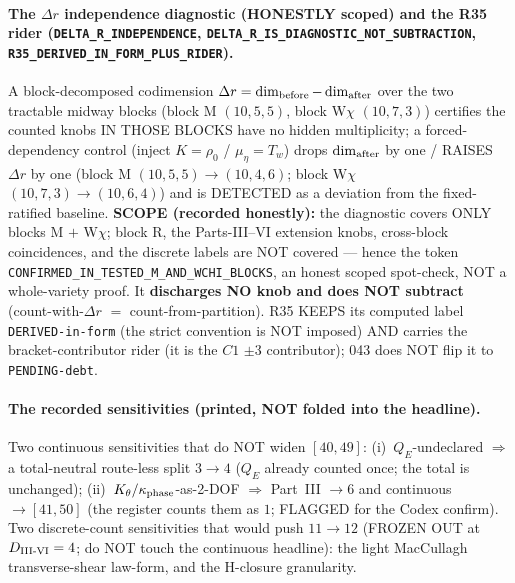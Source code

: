 \paragraph{The \(\Delta r\) independence diagnostic (HONESTLY scoped) and the R35 rider (\texttt{DELTA\_R\_INDEPENDENCE}, \texttt{DELTA\_R\_IS\_DIAGNOSTIC\_NOT\_SUBTRACTION}, \texttt{R35\_DERIVED\_IN\_FORM\_PLUS\_RIDER}).}
A block-decomposed codimension \(\Delta r=\dim_{\rm before}-\dim_{\rm after}\) over
the two tractable midway blocks (block M \((10,5,5)\), block W\(\chi\) \((10,7,3)\))
certifies the counted knobs IN THOSE BLOCKS have no hidden multiplicity; a
forced-dependency control (inject \(K=\rho_0\) / \(\mu_\eta=T_w\)) drops
\(\dim_{\rm after}\) by one / RAISES \(\Delta r\) by one (block M
\((10,5,5)\to(10,4,6)\); block W\(\chi\) \((10,7,3)\to(10,6,4)\)) and is DETECTED as
a deviation from the fixed-ratified baseline. \textbf{SCOPE (recorded honestly):} the
diagnostic covers ONLY blocks M \(+\) W\(\chi\); block R, the Parts-III--VI extension
knobs, cross-block coincidences, and the discrete labels are NOT covered --- hence the
token \texttt{CONFIRMED\_IN\_TESTED\_M\_AND\_WCHI\_BLOCKS}, an honest scoped
spot-check, NOT a whole-variety proof. It \textbf{discharges NO knob and does NOT
subtract} (count-with-\(\Delta r\) \(=\) count-from-partition). R35 KEEPS its computed
label \texttt{DERIVED-in-form} (the strict convention is NOT imposed) AND carries the
bracket-contributor rider (it is the \(C1\) \(\pm3\) contributor); 043 does NOT flip
it to \texttt{PENDING-debt}.

\paragraph{The recorded sensitivities (printed, NOT folded into the headline).}
Two continuous sensitivities that do NOT widen \([40,49]\): (i)~\(Q_E\)-undeclared
\(\Rightarrow\) a total-neutral route-less split \(3\to4\) (\(Q_E\) already counted
once; the total is unchanged); (ii)~\(K_\theta/\kappa_{\rm phase}\)-as-2-DOF
\(\Rightarrow\) Part~III \(\to6\) and continuous \(\to[41,50]\) (the register counts
them as \(1\); FLAGGED for the Codex confirm). Two discrete-count sensitivities that
would push \(11\to12\) (FROZEN OUT at \(D_{\rm III\text{-}VI}=4\); do NOT touch the
continuous headline): the light MacCullagh transverse-shear law-form, and the
H-closure granularity.

